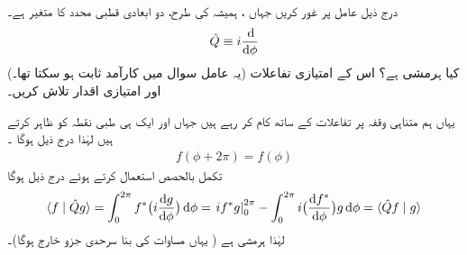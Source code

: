 درج ذیل عامل پر غور کریں جہاں    ، ہمیشہ کی طرح،  دو ابعادی قطبی محدد کا      متغیر ہے۔
\begin{align}
	\hat{Q} \equiv i\frac{\dif }{\dif \phi}
\end{align}
(یہ عامل سوال  میں کارآمد ثابت ہو سکتا تھا۔)  کیا  ہرمشی ہے؟ اس کے امتیازی تفاعلات اور امتیازی اقدار تلاش کریں۔

 \quad
 یہاں ہم متناہی وقفہ  پر تفاعلات   کے ساتھ کام کر رہے ہیں جہاں  اور  ایک ہی طبی نقطہ کو ظاہر کرتے ہیں  لہٰذا  درج ذیل ہوگا ۔
\begin{align}\label{مساوات_قواعد_دہراتا_تفاعل}
	f(\phi + 2\pi) = f(\phi)
\end{align}
تکمل بالحصص استعمال کرتے ہوئے درج ذیل ہوگا 
\begin{align*}
	\langle f\mid\hat{Q}g \rangle = \int_{0}^{2\pi}f^{*}\big(i\frac{\dif g}{\dif \phi}\big)\dif \phi = \left. if^{*}g\right\vert^{2\pi}_{0} - \int_{0}^{2\pi}i\big(\frac{\dif f^*}{\dif \phi}\big)g\dif \phi = \langle \hat{Q}f\mid g \rangle
\end{align*}
لہٰذا  ہرمشی ہے ( یہاں مساوات  کی بنا سرحدی جزو خارج ہوگا)۔

